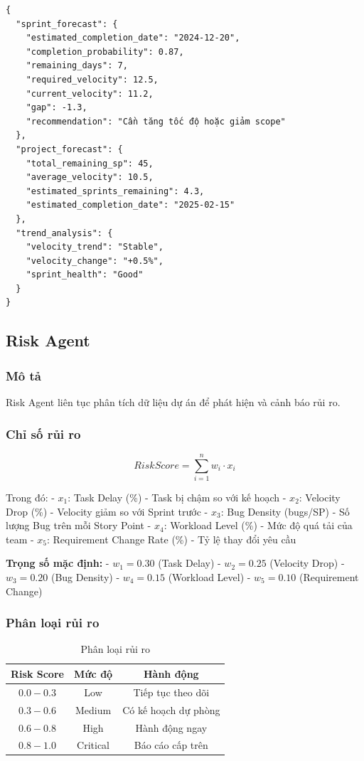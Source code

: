 \documentclass[12pt,a4paper]{report}
\begin{document}
\begin{verbatim}
{
  "sprint_forecast": {
    "estimated_completion_date": "2024-12-20",
    "completion_probability": 0.87,
    "remaining_days": 7,
    "required_velocity": 12.5,
    "current_velocity": 11.2,
    "gap": -1.3,
    "recommendation": "Cần tăng tốc độ hoặc giảm scope"
  },
  "project_forecast": {
    "total_remaining_sp": 45,
    "average_velocity": 10.5,
    "estimated_sprints_remaining": 4.3,
    "estimated_completion_date": "2025-02-15"
  },
  "trend_analysis": {
    "velocity_trend": "Stable",
    "velocity_change": "+0.5%",
    "sprint_health": "Good"
  }
}
\end{verbatim}

\subsection{Risk Agent}

\subsubsection{Mô tả}

Risk Agent liên tục phân tích dữ liệu dự án để phát hiện và cảnh báo rủi ro.

\subsubsection{Chỉ số rủi ro}

\[
RiskScore = \sum_{i=1}^{n} w_i \cdot x_i
\]

Trong đó:
- \(x_1\): Task Delay (\%) - Task bị chậm so với kế hoạch
- \(x_2\): Velocity Drop (\%) - Velocity giảm so với Sprint trước
- \(x_3\): Bug Density (bugs/SP) - Số lượng Bug trên mỗi Story Point
- \(x_4\): Workload Level (\%) - Mức độ quá tải của team
- \(x_5\): Requirement Change Rate (\%) - Tỷ lệ thay đổi yêu cầu

\textbf{Trọng số mặc định:}
- \(w_1 = 0.30\) (Task Delay)
- \(w_2 = 0.25\) (Velocity Drop)
- \(w_3 = 0.20\) (Bug Density)
- \(w_4 = 0.15\) (Workload Level)
- \(w_5 = 0.10\) (Requirement Change)

\subsubsection{Phân loại rủi ro}

\begin{table}[H]
\centering
\caption{Phân loại rủi ro}
\begin{tabular}{|c|c|c|}
\hline
\textbf{Risk Score} & \textbf{Mức độ} & \textbf{Hành động} \\
\hline
$0.0 - 0.3$ & Low & Tiếp tục theo dõi \\
\hline
$0.3 - 0.6$ & Medium & Có kế hoạch dự phòng \\
\hline
$0.6 - 0.8$ & High & Hành động ngay \\
\hline
$0.8 - 1.0$ & Critical & Báo cáo cấp trên \\
\hline
\end{tabular}
\label{tab:risk_levels}
\end{table}
\end{document}
